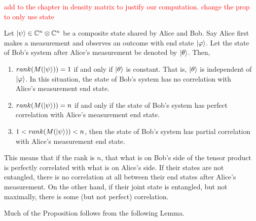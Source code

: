 
\textcolor{red}{add to the chapter in density matrix to justify our computation. change the prop to only use state}
\begin{prop}
\label{entanglement-rank}
Let $\ket{\psi} \in \mathbb{C}^n \otimes \mathbb{C}^{n}$ be a composite state shared by Alice and Bob. Say Alice first makes a measurement and observes an outcome with end state $\ket{\varphi}$. Let the state of Bob's system after Alice's measurement be denoted by $\ket{\theta}$. Then,
\begin{enumerate}
    \item $rank(M(\ket{\psi}))=1$ if and only if $\ket{\theta}$ is constant.  That is, $\ket{\theta}$ is independent of $\ket{\varphi}$. In this situation, the state of Bob's system has no correlation with Alice's measurement end state.
    \item $rank(M(\ket{\psi}))=n$ if and only if the state of Bob's system has perfect correlation with Alice's measurement end state.
    \item $1<rank(M(\ket{\psi}))<n$, then the state of Bob's system has partial correlation with Alice's measurement end state.
\end{enumerate}
\end{prop}

This means that if the rank is $n$, that what is on Bob's side of the tensor product is perfectly correlated with what is on Alice's side.  If their states are not entangled, there is no correlation at all between their end states after Alice's measurement.  On the other hand, if their joint state is entangled, but not maximally, there is some (but not perfect) correlation.  

Much of the Proposition follows from the following Lemma.  




